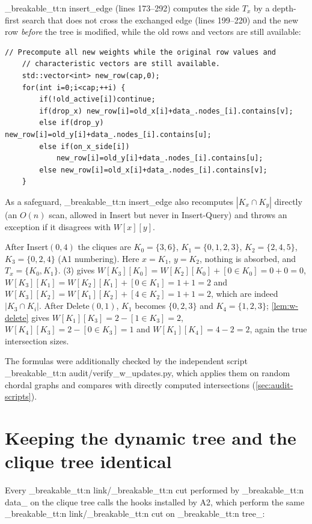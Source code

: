 \documentclass[11pt,a4paper,oneside]{report}
\theoremstyle{plain}
\theoremstyle{definition}
\theoremstyle{remark}
\newcommand{\op}[1]{\textsf{#1}}
\DeclareRobustCommand{\code}[1]{\mtp_breakable_tt:n {#1}}
\DeclareRobustCommand{\file}[1]{\mtp_breakable_tt:n {#1}}
\begin{document}
\noindent \code{insert_edge} (lines 173--292) computes the side \(T_x\) by a depth-first search
that does not cross the exchanged edge (lines 199--220) and the new row \emph{before} the tree
is modified, while the old rows and vectors are still available:

\begin{lstlisting}[style=cpp,firstnumber=222,caption={\file{src/dynamic_ibarra_a2.cpp}, lines 222--232: the new row of \(W\) after \op{Insert} (\cref{lem:w-insert}).},label={lst:a2-wins}]
    // Precompute all new weights while the original row values and
    // characteristic vectors are still available.
    std::vector<int> new_row(cap,0);
    for(int i=0;i<cap;++i) {
        if(!old_active[i])continue;
        if(drop_x) new_row[i]=old_x[i]+data_.nodes_[i].contains[v];
        else if(drop_y) new_row[i]=old_y[i]+data_.nodes_[i].contains[u];
        else if(on_x_side[i])
            new_row[i]=old_y[i]+data_.nodes_[i].contains[u];
        else new_row[i]=old_x[i]+data_.nodes_[i].contains[v];
    }
\end{lstlisting}

\noindent As a safeguard, \code{insert_edge} also recomputes \(|K_x\cap K_y|\) directly (an
\(O(n)\) scan, allowed in \op{Insert} but never in \op{Insert-Query}) and throws an exception if
it disagrees with \(W[x][y]\).

\begin{example}
After \op{Insert}\((0,4)\) the cliques are \(K_0=\{3,6\}\), \(K_1=\{0,1,2,3\}\),
\(K_2=\{2,4,5\}\), \(K_3=\{0,2,4\}\) (A1 numbering). Here \(x=K_1\), \(y=K_2\), nothing is
absorbed, and \(T_x=\{K_0,K_1\}\). (3) gives
\(W[K_3][K_0]=W[K_2][K_0]+[0\in K_0]=0+0=0\),
\(W[K_3][K_1]=W[K_2][K_1]+[0\in K_1]=1+1=2\) and
\(W[K_3][K_2]=W[K_1][K_2]+[4\in K_2]=1+1=2\), which are indeed \(|K_3\cap K_i|\).
After \op{Delete}\((0,1)\), \(K_1\) becomes \(\{0,2,3\}\) and \(K_4=\{1,2,3\}\);
\cref{lem:w-delete} gives \(W[K_1][K_3]=2-[1\in K_3]=2\), \(W[K_4][K_3]=2-[0\in K_3]=1\) and
\(W[K_1][K_4]=4-2=2\), again the true intersection sizes.
\end{example}

The formulas were additionally checked by the independent script
\file{audit/verify_w_updates.py}, which applies them on random chordal graphs and compares with
directly computed intersections (\cref{sec:audit-scripts}).

\section{Keeping the dynamic tree and the clique tree identical}
Every \code{link}/\code{cut} performed by \code{data_} on the clique tree calls the hooks
installed by A2, which perform the same \code{link}/\code{cut} on \code{tree_}:
\end{document}
